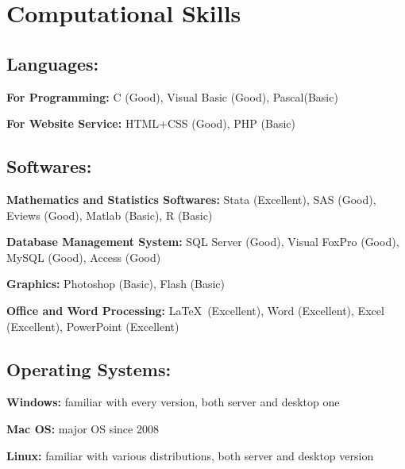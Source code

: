 \documentclass[letterpaper]{article}
\renewenvironment{itemize}{
  \begin{list}{}{
    \setlength{\leftmargin}{1.5em}
    \setlength{\itemsep}{0pt}
  }
}{
  \end{list}
}
\begin{document}
\section*{Computational Skills}
\subsection*{Languages:}
\begin{itemize}
\item \textbf{For Programming:} C (Good), Visual Basic (Good), Pascal(Basic)
\item \textbf{For Website Service:} HTML+CSS (Good), PHP (Basic)
\end{itemize}

\subsection*{Softwares:}
\begin{itemize}
\item \textbf{Mathematics and Statistics Softwares:} Stata (Excellent), SAS (Good), Eviews (Good), Matlab (Basic), R (Basic)
\item \textbf{Database Management System:} SQL Server (Good), Visual FoxPro (Good), MySQL (Good), Access (Good)
\item \textbf{Graphics:} Photoshop (Basic), Flash (Basic)
\item \textbf{Office and Word Processing:} \LaTeX\ (Excellent), Word (Excellent), Excel (Excellent), PowerPoint (Excellent)
\end{itemize}

\subsection*{Operating Systems:}
\begin{itemize}
\item \textbf{Windows:} familiar with every version, both server and desktop one
\item \textbf{Mac OS:} major OS since 2008
\item \textbf{Linux:} familiar with various distributions, both server and desktop version
\end{itemize}
\end{document}
